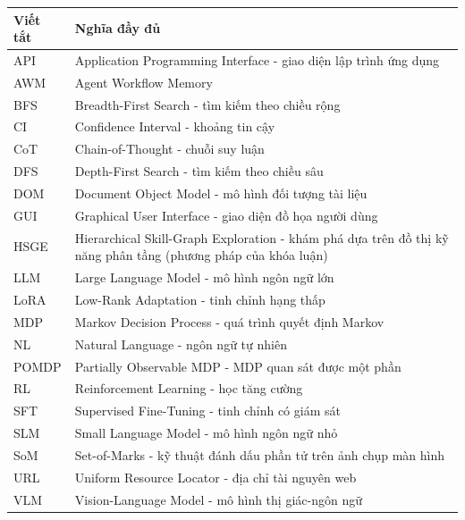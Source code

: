 \begin{longtable}{L{3.5cm} L{10.5cm}}
\toprule
\textbf{Viết tắt} & \textbf{Nghĩa đầy đủ} \\
\midrule
API & Application Programming Interface - giao diện lập trình ứng dụng \\
AWM & Agent Workflow Memory \\
BFS & Breadth-First Search - tìm kiếm theo chiều rộng \\
CI & Confidence Interval - khoảng tin cậy \\
CoT & Chain-of-Thought - chuỗi suy luận \\
DFS & Depth-First Search - tìm kiếm theo chiều sâu \\
DOM & Document Object Model - mô hình đối tượng tài liệu \\
GUI & Graphical User Interface - giao diện đồ họa người dùng \\
HSGE & Hierarchical Skill-Graph Exploration - khám phá dựa trên đồ thị kỹ
năng phân tầng (phương pháp của khóa luận) \\
LLM & Large Language Model - mô hình ngôn ngữ lớn \\
LoRA & Low-Rank Adaptation - tinh chỉnh hạng thấp \\
MDP & Markov Decision Process - quá trình quyết định Markov \\
NL & Natural Language - ngôn ngữ tự nhiên \\
POMDP & Partially Observable MDP - MDP quan sát được một phần \\
RL & Reinforcement Learning - học tăng cường \\
SFT & Supervised Fine-Tuning - tinh chỉnh có giám sát \\
SLM & Small Language Model - mô hình ngôn ngữ nhỏ \\
SoM & Set-of-Marks - kỹ thuật đánh dấu phần tử trên ảnh chụp màn hình \\
URL & Uniform Resource Locator - địa chỉ tài nguyên web \\
VLM & Vision-Language Model - mô hình thị giác-ngôn ngữ \\
\bottomrule
\end{longtable}
